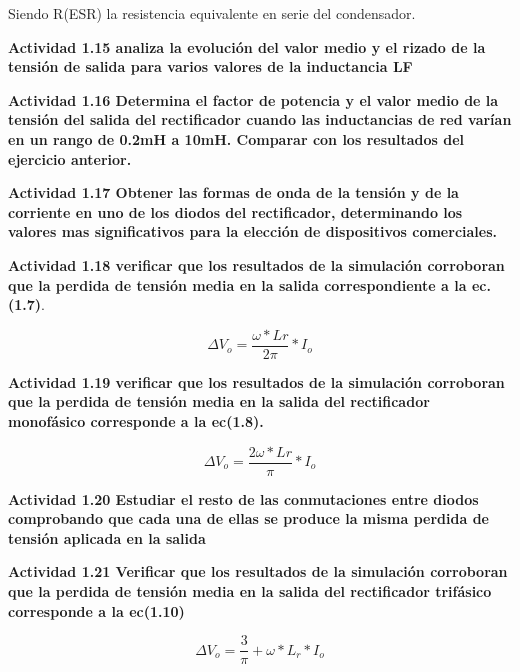﻿\documentclass[letterpaper]{article}
\begin{document}
Siendo R(ESR) la resistencia equivalente en serie del condensador. 
 \begin{large}

\textbf{Actividad 1.15 analiza la evolución del valor medio y el rizado de
la tensión de salida para varios valores de la inductancia LF}\end{large}
 \begin{large}

\textbf{Actividad 1.16 Determina el factor de potencia y el valor medio de
la tensión del salida del rectificador cuando las inductancias de
red varían en un rango de 0.2mH a 10mH. Comparar con los resultados
del ejercicio anterior.} \end{large}
 \begin{large}

\textbf{Actividad 1.17 Obtener las formas de onda de la tensión y de la corriente
en uno de los diodos del rectificador, determinando los valores mas
significativos para la elección de dispositivos comerciales.} \end{large}
 \begin{large}

\textbf{Actividad 1.18 verificar que los resultados de la simulación corroboran
que la perdida de tensión media en la salida correspondiente a la
ec.(1.7)}.\end{large}
 \begin{large}

\[
\Delta V_{o}=\frac{\omega*L{r}}{2\pi}*I_{o}
\]\end{large}
 \begin{large}

\textbf{Actividad 1.19 verificar que los resultados de la simulación corroboran
que la perdida de tensión media en la salida del rectificador monofásico
corresponde a la ec(1.8).}\end{large}
 \begin{large}

\[
\Delta V_{o}=\frac{2\omega*L{r}}{\pi}*I_{o}
\]\end{large}
 \begin{large}

\textbf{Actividad 1.20 Estudiar el resto de las conmutaciones entre diodos
comprobando que cada una de ellas se produce la misma perdida de tensión
aplicada en la salida} \end{large}
 \begin{large}

\textbf{Actividad 1.21 Verificar que los resultados de la simulación corroboran
que la perdida de tensión media en la salida del rectificador trifásico
corresponde a la ec(1.10)}\end{large} \begin{large}

\[
\Delta V_{o}=\frac{3}{\pi}+\omega*L_{r}*I_{o}
\]
	\end{large}
    
\end{document}
